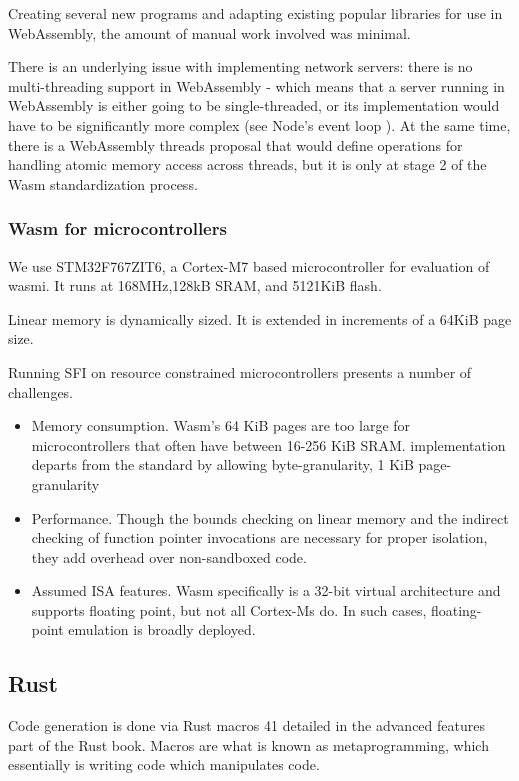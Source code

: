 \documentclass{ieeeaccess}
\begin{document}
Creating several new programs and adapting existing popular libraries for use in WebAssembly, the amount of manual work involved was minimal.

There is an underlying issue with implementing network servers: there is no multi-threading support in WebAssembly - which means that a server running in WebAssembly is either going to be single-threaded, or its implementation would have to be significantly more complex (see Node’s event loop ). At the same time, there is a WebAssembly threads proposal that would define operations for handling atomic memory access across threads, but it is only at stage 2 of the Wasm standardization process.

\subsubsection{Wasm for microcontrollers}

We use STM32F767ZIT6, a Cortex-M7 based microcontroller for evaluation of wasmi. It runs at 168MHz,128kB SRAM, and 5121KiB flash.

Linear memory is dynamically sized. It is extended in increments of a 64KiB page size. 

Running SFI on resource constrained microcontrollers presents a number of challenges.

\begin{itemize}
    \item Memory consumption. Wasm's 64 KiB pages are too large for microcontrollers that often have between 16-256 KiB SRAM. \cite{ewasm} implementation departs from the standard by allowing byte-granularity, 1 KiB page-granularity
    \item Performance. Though the bounds checking on linear memory and the indirect checking of function pointer invocations are necessary for proper isolation, they add overhead over non-sandboxed code.
    \item Assumed ISA features. Wasm specifically is a 32-bit virtual architecture and supports floating point, but not all Cortex-Ms do. In such cases, floating-point emulation is broadly deployed.
\end{itemize}

\subsection{Rust}

Code generation is done via Rust macros 41 detailed in the advanced features part of the Rust book. Macros are what is known as metaprogramming, which essentially is writing code which manipulates code. 
\end{document}
